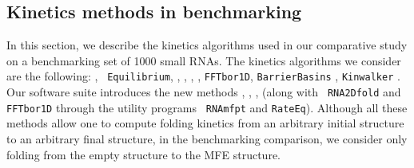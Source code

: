 \subsection*{Kinetics methods in benchmarking}

In this section, we describe the kinetics algorithms used in our
comparative study on a benchmarking set of 1000 small RNAs. The
kinetics algorithms we consider are the following: \rnamfpt, {\tt
Equilibrium}, \kinfold \cite{flamm}, \fftmfpt, \ffteq,
\rnatwofold, {\tt FFTbor1D}, {\tt BarrierBasins}
\cite{wolfingerStadler:kinetics}, {\tt Kinwalker} \cite{Geis.jmb08}.
Our software suite \hermes introduces the new methods \rnamfpt,
\rnaeq, \fftmfpt, \ffteq (along with {\tt
RNA2Dfold} and {\tt FFTbor1D} through the utility programs {\tt
RNAmfpt} and {\tt RateEq}). Although all these methods allow one to
compute folding kinetics from an arbitrary initial structure to an
arbitrary final structure, in the benchmarking comparison, we consider
only folding from the empty structure to the MFE structure.
